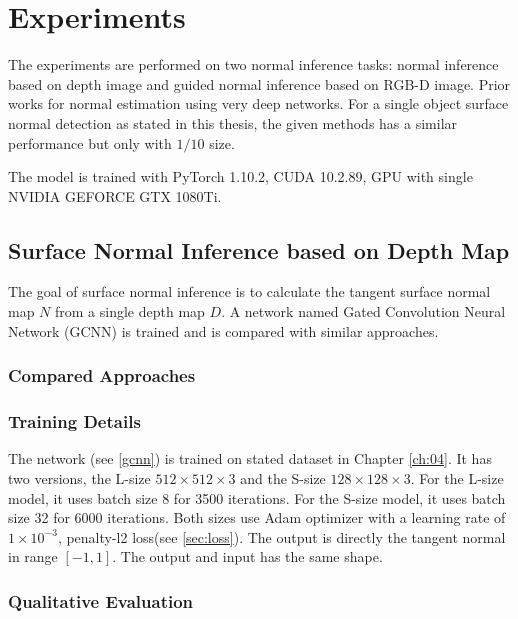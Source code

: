 
\chapter{Experiments} %

\label{ch:05} %
The experiments are performed on two normal inference tasks: normal inference based on depth image and guided normal inference based on RGB-D image. Prior works for normal estimation using very deep networks. For a single object surface normal detection as stated in this thesis, the given methods has a similar performance but only with $ 1/10 $ size.

The model is trained with PyTorch 1.10.2, CUDA 10.2.89, GPU with single NVIDIA GEFORCE GTX 1080Ti.


\section{Surface Normal Inference based on Depth Map}
The goal of surface normal inference is to calculate the tangent surface normal map $ N $ from a single depth map $ D $. A network named Gated Convolution Neural Network (GCNN) is trained and is compared with similar approaches.

\subsection{Compared Approaches}


\subsection{Training Details}
The network (see \ref{gcnn}) is trained on stated dataset in Chapter \ref{ch:04}. It has two versions, the L-size $ 512\times512\times3 $ and the  S-size $ 128\times128\times3 $. For the L-size model, it uses batch size 8 for 3500 iterations. For the S-size model, it uses batch size 32 for 6000 iterations. Both sizes use Adam optimizer \cite{adam} with a learning rate of $ 1\times10^{-3} $, penalty-l2 loss(see \ref{sec:loss}). The output is directly the tangent normal in range $ \left[-1,1\right] $. The output and input has the same shape.


\subsection{Qualitative Evaluation}

